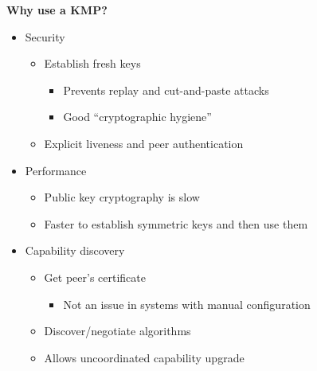 \documentclass[helvetica]{seminar}
\newcommand{\heading}[1]{%
  \begin{center} 
    \large\bf 
    #1 
  \end{center} 
  \vspace{.4 in}}
\begin{document}
\begin{slide}
\heading{Why use a KMP?}

\vspace{-.35 in}
\begin{itemize}
\item Security
\begin{itemize}
\item Establish fresh keys
\begin{itemize}
\item Prevents replay and cut-and-paste attacks
\item Good ``cryptographic hygiene''
\end{itemize}
\item Explicit liveness and peer authentication
\end{itemize}
\item Performance
\begin{itemize}
\item Public key cryptography is slow
\item Faster to establish symmetric keys and then use them
\end{itemize}
\item Capability discovery
\begin{itemize}
\item Get peer's certificate
\begin{itemize}
\item Not an issue in systems with manual configuration
\end{itemize}
\item Discover/negotiate algorithms
\item Allows uncoordinated capability upgrade
\end{itemize}
\end{itemize}
\end{slide}
\end{document}
